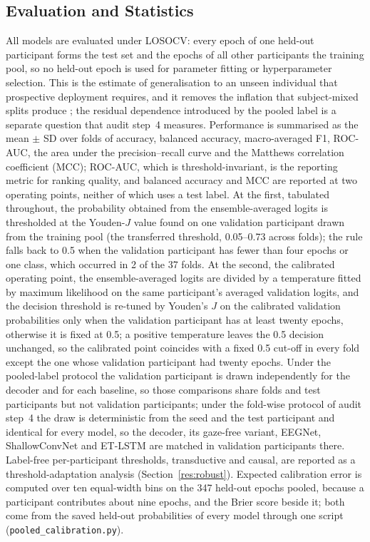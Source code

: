 \subsection{Evaluation and Statistics}\label{sec:eval}

All models are evaluated under LOSOCV: every epoch of one held-out participant forms the test set and the epochs of all other participants the training pool, so no held-out epoch is used for parameter fitting or hyperparameter selection. This is the estimate of generalisation to an unseen individual that prospective deployment requires, and it removes the inflation that subject-mixed splits produce \cite{ref13,ref28,ref29,ref30,ref62}; the residual dependence introduced by the pooled label is a separate question that audit step~4 measures. Performance is summarised as the mean $\pm$ SD over folds of accuracy, balanced accuracy, macro-averaged F1, ROC-AUC, the area under the precision--recall curve and the Matthews correlation coefficient (MCC); ROC-AUC, which is threshold-invariant, is the reporting metric for ranking quality, and balanced accuracy and MCC are reported at two operating points, neither of which uses a test label. At the first, tabulated throughout, the probability obtained from the ensemble-averaged logits is thresholded at the Youden-$J$ value found on one validation participant drawn from the training pool (the transferred threshold, 0.05--0.73 across folds); the rule falls back to 0.5 when the validation participant has fewer than four epochs or one class, which occurred in 2 of the 37 folds. At the second, the calibrated operating point, the ensemble-averaged logits are divided by a temperature fitted by maximum likelihood on the same participant's averaged validation logits, and the decision threshold is re-tuned by Youden's $J$ on the calibrated validation probabilities only when the validation participant has at least twenty epochs, otherwise it is fixed at 0.5; a positive temperature leaves the 0.5 decision unchanged, so the calibrated point coincides with a fixed 0.5 cut-off in every fold except the one whose validation participant had twenty epochs. Under the pooled-label protocol the validation participant is drawn independently for the decoder and for each baseline, so those comparisons share folds and test participants but not validation participants; under the fold-wise protocol of audit step~4 the draw is deterministic from the seed and the test participant and identical for every model, so the decoder, its gaze-free variant, EEGNet, ShallowConvNet and ET-LSTM are matched in validation participants there. Label-free per-participant thresholds, transductive and causal, are reported as a threshold-adaptation analysis (Section~\ref{res:robust}). Expected calibration error is computed over ten equal-width bins on the 347 held-out epochs pooled, because a participant contributes about nine epochs, and the Brier score beside it; both come from the saved held-out probabilities of every model through one script (\texttt{pooled\_calibration.py}).

